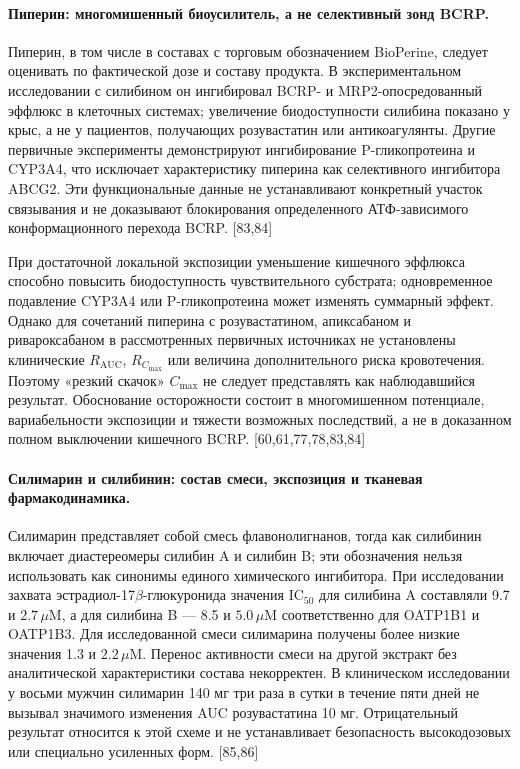 \documentclass[11pt]{article}
\begin{document}
\paragraph{Пиперин: многомишенный биоусилитель, а не селективный зонд BCRP.}
Пиперин, в том числе в составах с торговым обозначением BioPerine, следует оценивать по фактической дозе и составу продукта. В экспериментальном исследовании с силибином он ингибировал BCRP- и MRP2-опосредованный эффлюкс в клеточных системах; увеличение биодоступности силибина показано у крыс, а не у пациентов, получающих розувастатин или антикоагулянты. Другие первичные эксперименты демонстрируют ингибирование P-гликопротеина и CYP3A4, что исключает характеристику пиперина как селективного ингибитора ABCG2. Эти функциональные данные не устанавливают конкретный участок связывания и не доказывают блокирования определенного АТФ-зависимого конформационного перехода BCRP. [83,84]

При достаточной локальной экспозиции уменьшение кишечного эффлюкса способно повысить биодоступность чувствительного субстрата; одновременное подавление CYP3A4 или P-гликопротеина может изменять суммарный эффект. Однако для сочетаний пиперина с розувастатином, апиксабаном и ривароксабаном в рассмотренных первичных источниках не установлены клинические \(R_{\mathrm{AUC}}\), \(R_{C_{\max}}\) или величина дополнительного риска кровотечения. Поэтому «резкий скачок» \(C_{\max}\) не следует представлять как наблюдавшийся результат. Обоснование осторожности состоит в многомишенном потенциале, вариабельности экспозиции и тяжести возможных последствий, а не в доказанном полном выключении кишечного BCRP. [60,61,77,78,83,84]

\paragraph{Силимарин и силибинин: состав смеси, экспозиция и тканевая фармакодинамика.}
Силимарин представляет собой смесь флавонолигнанов, тогда как силибинин включает диастереомеры силибин A и силибин B; эти обозначения нельзя использовать как синонимы единого химического ингибитора. При исследовании захвата эстрадиол-17\(\beta\)-глюкуронида значения \(\mathrm{IC}_{50}\) для силибина A составляли 9.7 и \(2.7\,\mu\mathrm{M}\), а для силибина B --- 8.5 и \(5.0\,\mu\mathrm{M}\) соответственно для OATP1B1 и OATP1B3. Для исследованной смеси силимарина получены более низкие значения 1.3 и \(2.2\,\mu\mathrm{M}\). Перенос активности смеси на другой экстракт без аналитической характеристики состава некорректен. В клиническом исследовании у восьми мужчин силимарин 140 мг три раза в сутки в течение пяти дней не вызывал значимого изменения AUC розувастатина 10 мг. Отрицательный результат относится к этой схеме и не устанавливает безопасность высокодозовых или специально усиленных форм. [85,86]
\end{document}
